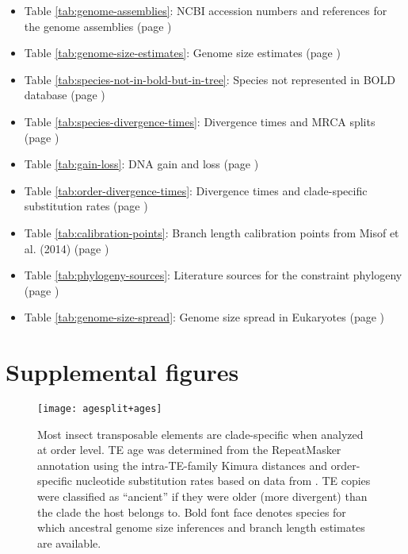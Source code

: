 \begin{itemize}
	\item Table \ref{tab:genome-assemblies}: NCBI accession numbers and references for the genome assemblies (page \pageref{tab:genome-assemblies})
	\item Table \ref{tab:genome-size-estimates}: Genome size estimates (page \pageref{tab:genome-size-estimates})
	\item Table \ref{tab:species-not-in-bold-but-in-tree}: Species not represented in BOLD database (page \pageref{tab:species-not-in-bold-but-in-tree})
	\item Table \ref{tab:species-divergence-times}: Divergence times and MRCA splits (page \pageref{tab:species-divergence-times})
	\item Table \ref{tab:gain-loss}: DNA gain and loss (page \pageref{tab:gain-loss})
	\item Table \ref{tab:order-divergence-times}: Divergence times and clade-specific substitution rates (page \pageref{tab:order-divergence-times})
	\item Table \ref{tab:calibration-points}: Branch length calibration points from Misof et al. (2014) (page \pageref{tab:calibration-points})
	\item Table \ref{tab:phylogeny-sources}: Literature sources for the constraint phylogeny (page \pageref{tab:phylogeny-sources})
	\item Table \ref{tab:genome-size-spread}: Genome size spread in Eukaryotes (page \pageref{tab:genome-size-spread})
\end{itemize}


\section{Supplemental figures}

\begin{figure}[h!]
\centering
\texttt{[image: agesplit+ages]}
\caption[Most insect TEs are clade-specific]{Most insect transposable elements are clade-specific when analyzed at order level. TE age was determined from the RepeatMasker \citep{Smit2015} annotation using the intra-TE-family Kimura distances and order-specific nucleotide substitution rates based on data from \citet{Misof2014}. TE copies were classified as ``ancient'' if they were older (more divergent) than the clade the host belongs to. Bold font face denotes species for which ancestral genome size inferences and branch length estimates are available.}
\label{fig:agesplit}
\end{figure}


